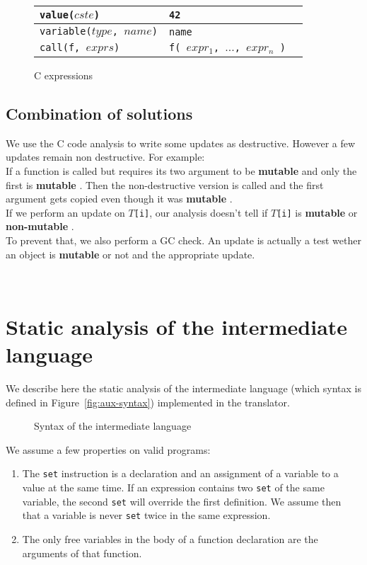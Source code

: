 \documentclass[12pt,a4paper]{article}
\newcommand{\cl}[1]{\texttt{#1}}
\newcommand{\mut}{  \textbf{ mutable } }
\newcommand{\nmut}{ \textbf{ non-mutable } }
\begin{document}
\begin{figure}[!ht]
\begin{tabular}{|p{50mm}|p{50mm}|p{50mm}|}
\hline
\cl{value($cste$)} & \cl{42} & \\ \hline
\cl{variable($type$, $name$)} & \cl{name} & \\ \hline
\cl{call(f, $exprs$)} & \cl{f( $expr_1$, $...$, $expr_n$ )} & \\ \hline
\end{tabular}
\caption{C expressions}
\end{figure}




\subsection{Combination of solutions}

We use the C code analysis to write some updates as destructive. However a few updates remain non destructive. For example:\\

If a function is called but requires its two argument to be \mut  and only the first is \mut. Then the non-destructive version is called and the first argument gets copied even though it was \mut.\\

If we perform an update on \cl{$T$[i]}, our analysis doesn't tell if \cl{$T$[i]} is \mut or \nmut.\\

To prevent that, we also perform a GC check. An update is actually a test wether an object is \mut or not and the appropriate update.





\newpage 
\ \newpage
\section{Static analysis of the intermediate language}
\label{sec:StaticAnal}

We describe here the static analysis of the intermediate language (which syntax is defined in Figure~\ref{fig:aux-syntax}) implemented in the translator.

\begin{figure}[!ht]

\caption{Syntax of the intermediate language}
\end{figure}

We assume a few properties on valid programs:
\begin{enumerate}
\item The \cl{set} instruction is a declaration and an assignment of a variable to a value at the same time. If an expression contains two \cl{set} of the same variable, the second \cl{set} will override the first definition. We assume then that a variable is never \cl{set} twice in the same expression.
\item The only free variables in the body of a function declaration are the arguments of that function.
\end{enumerate}
\end{document}
